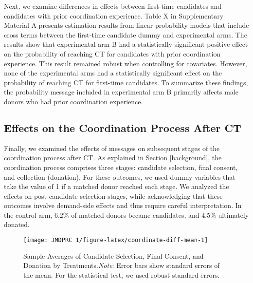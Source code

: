\documentclass[12pt, a4paper]{article}
\begin{document}
Next, we examine differences in effects between first-time candidates and candidates with prior coordination experience. Table X in Supplementary Material A presents estimation results from linear probability models that include cross terms between the first-time candidate dummy and experimental arms. The results show that experimental arm B had a statistically significant positive effect on the probability of reaching CT for candidates with prior coordination experience. This result remained robust when controlling for covariates. However, none of the experimental arms had a statistically significant effect on the probability of reaching CT for first-time candidates. To summarize these findings, the probability message included in experimental arm B primarily affects male donors who had prior coordination experience.

\hypertarget{process}{%
\subsection{Effects on the Coordination Process After CT}\label{process}}

Finally, we examined the effects of messages on subsequent stages of the coordination process after CT. As explained in Section \ref{background}, the coordination process comprises three stages: candidate selection, final consent, and collection (donation). For these outcomes, we used dummy variables that take the value of 1 if a matched donor reached each stage. We analyzed the effects on post-candidate selection stages, while acknowledging that these outcomes involve demand-side effects and thus require careful interpretation. In the control arm, \(6.2\)\% of matched donors became candidates, and \(4.5\)\% ultimately donated.

\begin{figure}[t]
\texttt{[image: JMDPRC~1/figure-latex/coordinate-diff-mean-1]} \caption{Sample Averages of Candidate Selection, Final Consent, and Donation by Treatments.\newline \emph{Note}: Error bars show standard errors of the mean. For the statistical test, we used robust standard errors.}\label{fig:coordinate-diff-mean}
\end{figure}
\end{document}
